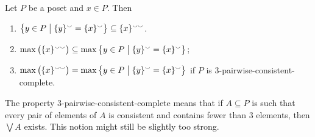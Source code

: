 \begin{lemma} \label{consistentExtensionLemma}
Let $P$ be a poset and $x\in P$. Then
\begin{enumerate}
\item $\setbuilder[\big]{y \in P}{ \{y\}^\cons = \{x\}^\cons } \subseteq \{x\}^{\cons\cons}$.
\item $\max \big(\{x\}^{\cons\cons}\big) \subseteq \max \setbuilder[\big]{y\in P}{ \{y\}^\cons = \{x\}^\cons }$;
\item $\max \big(\{x\}^{\cons\cons}\big) = \max \setbuilder[\big]{y\in P}{ \{y\}^\cons = \{x\}^\cons }$ if $P$ is 3-pairwise-consistent-complete.
\end{enumerate}
\end{lemma}
The property 3-pairwise-consistent-complete means that if $A\subseteq P$ is such that every pair of elements of $A$ is consistent and contains fewer than $3$ elements, then $\bigvee A$ exists. This notion might still be slightly too strong.
